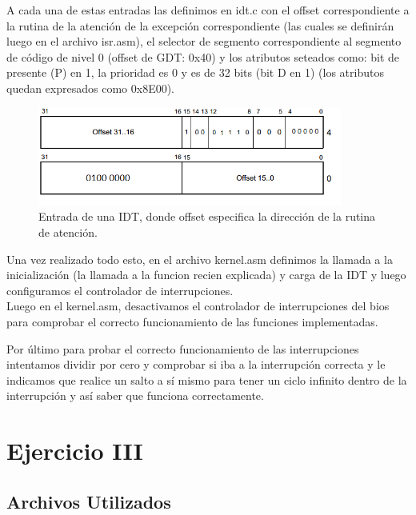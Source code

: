 \documentclass[a4paper]{article}
\begin{document}
A cada una de estas entradas las definimos en idt.c con el offset correspondiente a la rutina de la atención de la excepción correspondiente (las cuales se definirán luego en el archivo isr.asm), el selector de segmento correspondiente al segmento de código de nivel 0 (offset de GDT: 0x40) y los atributos seteados como: bit de presente (P) en 1, la prioridad es 0 y es de 32 bits (bit D en 1) (los atributos quedan expresados como 0x8E00).


\begin{figure}[ht!]
\centering
\includegraphics[width=100mm]{imagenes/IDTENTRY.png}
\caption {Entrada de una IDT, donde offset especifica la dirección de la rutina de atención.}
\end{figure}

Una vez realizado todo esto, en el archivo kernel.asm definimos la llamada a la inicialización (la llamada a la funcion recien explicada) y carga de la IDT y luego configuramos el controlador de interrupciones.\\


Luego en el kernel.asm, desactivamos el controlador de interrupciones del bios para comprobar el correcto funcionamiento de las funciones implementadas.


Por último para probar el correcto funcionamiento de las interrupciones intentamos dividir por cero y comprobar si iba a la interrupción correcta y le indicamos que realice un salto a sí mismo para tener un ciclo infinito dentro de la interrupción y así saber que funciona correctamente.













\newpage
\section{Ejercicio III}
\subsection{Archivos Utilizados}
\end{document}
